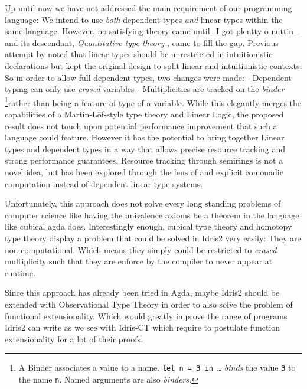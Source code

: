 \documentclass[
]{article}
\begin{document}
Up until now we have not addressed the main requirement of our
programming language: We intend to use \emph{both} dependent types
\emph{and} linear types within the same language. However, no satisfying
theory came until\_I got plentty o nuttin\_\cite{nuttin} and its
descendant, \emph{Quantitative type theory} \cite{qtt}, came to fill the
gap. Previous attempt by noted that linear types should be unrestricted
in intuitionistic declarations but kept the original design to split
linear and intuitionistic contexts. So in order to allow full dependent
types, two changes were made: - Dependent typing can only use
\emph{erased} variables - Multiplicities are tracked on the
\emph{binder} \footnote{A Binder associates a value to a name.
  \texttt{let\ n\ =\ 3\ in\ \ldots{}} \emph{binds} the value \texttt{3}
  to the name \texttt{n}. Named arguments are also \emph{binders}.}rather
than being a feature of type of a variable. While this elegantly merges
the capabilities of a Martin-Löf-style type theory\cite{martin-lof} and
Linear Logic\cite{linear-logic}, the proposed result does not touch upon
potential performance improvement that such a language could
feature\cite{store_indices}. However it has the potential to bring
together Linear types and dependent types in a way that allows precise
resource tracking and strong performance guarantees. Resource tracking
through semirings is not a novel idea, but has been explored through the
lens of and explicit comonadic computation
\cite{quantitative_coeffects}\cite{monad_or_comonad}\cite{effect_coeffects_grading}\cite{parametric_effects}\cite{coeffect_computation}
instead of dependent linear type systems.

Unfortunately, this approach does not solve every long standing problems
of computer science like having the univalence axioms be a theorem in
the language like cubical agda\cite{cubical_agda} does. Interestingly
enough, cubical type theory and homotopy type theory display a problem
that could be solved in Idris2 very easily: They are non-computational.
Which means they simply could be restricted to \emph{erased}
multiplicity such that they are enforce by the compiler to never appear
at runtime.

Since this approach has already been tried in Agda\cite{agda}, maybe
Idris2 should be extended with Observational Type Theory \cite{ott} in
order to also solve the problem of functional extensionality. Which
would greatly improve the range of programs Idris2 can write as we see
with Idris-CT\cite{idris-ct} which require to postulate function
extensionality for a lot of their proofs.
\end{document}
